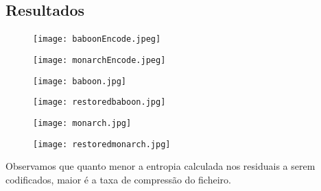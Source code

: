 \documentclass{report}
\begin{document}
\subsection*{Resultados}
\paragraph{}
\begin{center}
    \begin{figure} [h!]
    \centering
    \centering
    \texttt{[image: baboonEncode.jpeg]}
    \label{fig:baboon_encode}
    \end{figure}
\end{center}

\begin{center}
    \begin{figure} [h!]
    \centering
    \centering
    \texttt{[image: monarchEncode.jpeg]}
    \label{fig:monarch_encode}
    \end{figure}
\end{center}

	\begin{figure} [h!]
    \centering
    \begin{minipage}{.6\textwidth}
    \centering
    \texttt{[image: baboon.jpg]}
    \label{fig:light_increase}
    \end{minipage}%
    \begin{minipage}{.6\textwidth}
    \centering
    \texttt{[image: restoredbaboon.jpg]}
    \label{fig:light_decrease}
    \end{minipage}
    \end{figure}
    
    

	\begin{figure} [h!]
    \centering
    \begin{minipage}{.6\textwidth}
    \centering
    \texttt{[image: monarch.jpg]}
    \label{fig:light_increase}
    \end{minipage}%
    \begin{minipage}{.6\textwidth}
    \centering
    \texttt{[image: restoredmonarch.jpg]}
    \label{fig:light_decrease}
    \end{minipage}
    \end{figure}
\newpage
Observamos que quanto menor a entropia calculada nos residuais a serem
codificados, maior é a taxa de compressão do ficheiro.
\end{document}
